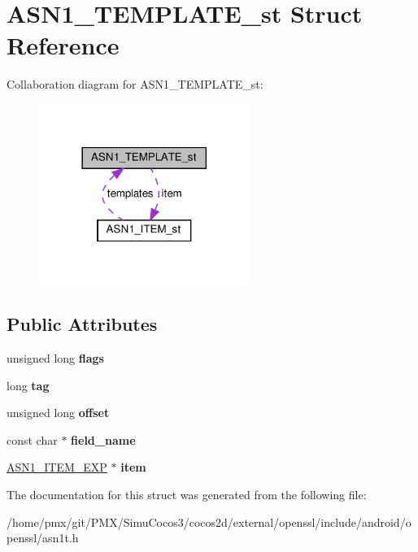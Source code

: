 \hypertarget{structASN1__TEMPLATE__st}{}\section{A\+S\+N1\+\_\+\+T\+E\+M\+P\+L\+A\+T\+E\+\_\+st Struct Reference}
\label{structASN1__TEMPLATE__st}


Collaboration diagram for A\+S\+N1\+\_\+\+T\+E\+M\+P\+L\+A\+T\+E\+\_\+st\+:
\nopagebreak
\begin{figure}[H]
\begin{center}
\leavevmode
\includegraphics[width=194pt]{structASN1__TEMPLATE__st__coll__graph}
\end{center}
\end{figure}
\subsection*{Public Attributes}
\begin{DoxyCompactItemize}
\item 
\mbox{\label{structASN1__TEMPLATE__st_aadbe8b5ea9d41920c3fc59d6c65848a8}} 
unsigned long {\bfseries flags}
\item 
\mbox{\label{structASN1__TEMPLATE__st_a8ef37d4a92684f1305627489e11a6b2e}} 
long {\bfseries tag}
\item 
\mbox{\label{structASN1__TEMPLATE__st_a6fed94625b157be3f3513fda21ae464f}} 
unsigned long {\bfseries offset}
\item 
\mbox{\label{structASN1__TEMPLATE__st_a2852dc8bb9be1b1ad2b71d37eceaa01d}} 
const char $\ast$ {\bfseries field\+\_\+name}
\item 
\mbox{\label{structASN1__TEMPLATE__st_ab61564de8daf02487468c73aa3386d5e}} 
\hyperlink{structASN1__ITEM__st}{A\+S\+N1\+\_\+\+I\+T\+E\+M\+\_\+\+E\+XP} $\ast$ {\bfseries item}
\end{DoxyCompactItemize}


The documentation for this struct was generated from the following file\+:\begin{DoxyCompactItemize}
\item 
/home/pmx/git/\+P\+M\+X/\+Simu\+Cocos3/cocos2d/external/openssl/include/android/openssl/asn1t.\+h\end{DoxyCompactItemize}
